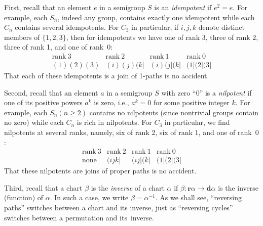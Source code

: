 \documentclass{surv-l}
\numberwithin{equation}{section}
\numberwithin{table}{section}
\numberwithin{figure}{section}
\theoremstyle{definition}
\begin{document}
First, recall that an element $e$ in a semigroup $S$ is an
\emph{idempotent} if $e^{2}=e$. For example,
each $S_{n}$, indeed any group, contains exactly one idempotent
while each $C_{n}$ contains several idempotents. For $C_{3}$ in
particular, if $i,j,k$ denote distinct members of $\{1, 2, 3\}$,
then for idempotents we have one of rank 3, three of rank 2, three
of rank 1, and one of rank~$0$:
\[
\begin{matrix}
\mathrm{rank}\ 3 &\mathrm{rank}\ 2 &\mathrm{rank}\ 1 &\mathrm{rank}\ 0 \\
(1)(2)(3) &(i)(j)(k] &(i)(j](k] &(1](2](3]
\end{matrix}
\]
That each of these idempotents is a join of 1-paths is no
accident.

Second, recall that an element $a$ in a semigroup $S$ with zero
``$0$'' is a \emph{nilpotent} if one of its
positive powers $a^{k}$ is zero, i.e., $a^{k}=0$ for some positive
integer $k$. For example, each $S_{n} (n\geq 2)$ contains no
nilpotents (since nontrivial groups contain no zero) while each
$C_{n}$ is rich in nilpotents. For $C_{3}$ in particular, we find
nilpotents at several ranks, namely, six of rank 2, six of rank 1,
and one of rank~$0$:
\[
\begin{matrix}
\mathrm{rank}\ 3 &\mathrm{rank}\ 2 &\mathrm{rank}\ 1 &\mathrm{rank}\ 0 \\
\mathrm{none} &(ijk] &(ij](k] &(1](2](3]
\end{matrix}
\]
That these nilpotents are joins of proper paths is no accident.

Third, recall that a chart $\beta$ is the \emph{inverse} of a
chart $\alpha$ if $\beta : \mathbf{r}\alpha\rightarrow
\mathbf{d}\alpha$ is the inverse (function) of $\alpha$. In such a
case, we write $\beta=\alpha^{-1}$. As we shall see, ``reversing
paths'' switches between a chart and its inverse, just as
``reversing cycles'' switches between a permutation and
its~inverse.
\end{document}
